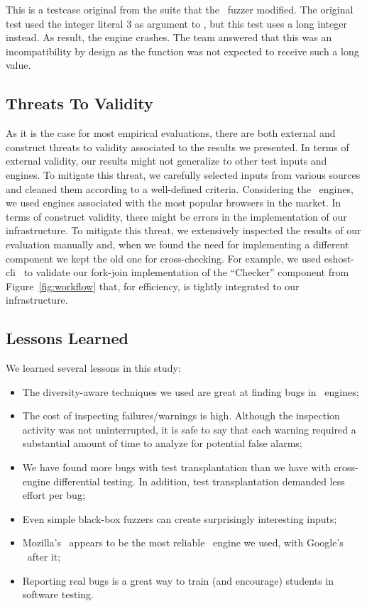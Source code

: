 \documentclass[10pt,conference,anonymous]{IEEEtran}
\begin{document}
This is a testcase original from the \jsc{} suite that the
\radamsa\ fuzzer modified. The original test used the integer literal
3 as argument to , but this test uses a long integer
instead. As result, the engine crashes. The team answered that this
was an incompatibility by design as the function was not expected to
receive such a long value.


\subsection{Threats To Validity}

As it is the case for most empirical evaluations, there are both
external and construct threats to validity associated to the results
we presented. In terms of external validity, our results might not
generalize to other test inputs and engines. To mitigate this threat,
we carefully selected inputs from various sources and cleaned them
according to a well-defined criteria. Considering the \js\ engines, we
used engines associated with the most popular browsers in the
market. In terms of construct validity, there might be errors in the
implementation of our infrastructure. To mitigate this threat, we
extensively inspected the results of our evaluation manually and, when
we found the need for implementing a different component we kept the
old one for cross-checking. For example, we used
eshost-cli~\cite{eshost-cli} to validate our fork-join implementation
of the ``Checker'' component from Figure~\ref{fig:workflow} that, for
efficiency, is tightly integrated to our infrastructure.

\subsection{Lessons Learned}
\label{sec:lessons}

We learned several lessons in this study:

\begin{itemize}
  \item The diversity-aware techniques we used are great
    at finding bugs in \js\ engines;
  \item The cost of inspecting failures/warnings is high. Although the
    inspection activity was not uninterrupted, it is safe to say that
    each warning required a substantial amount of time to analyze for
    potential false alarms;
  \item We have found more bugs with test transplantation than we have
    with cross-engine differential testing. In addition, test
    transplantation demanded less effort per bug;
  \item Even simple black-box fuzzers can create surprisingly
    interesting inputs;
  \item Mozilla's \smonkey\ appears to be the most reliable
    \js\ engine we used, with Google's \veight\ after it;
  \item Reporting real bugs is a great way to train (and encourage)
    students in software testing.
\end{itemize}
\end{document}
